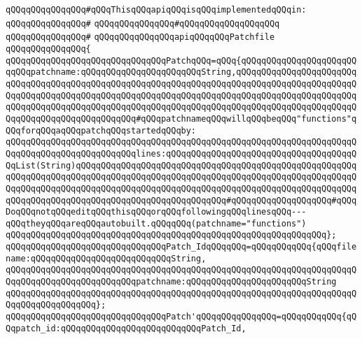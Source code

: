 \verb|qQQqqQQqqQQqqQQq#qQQqThisqQQqapiqQQqisqQQqimplementedqQQqin:|\newline
\verb|qQQqqQQqqQQqqQQq#|\newline
\verb|qQQqqQQqqQQqqQQq#qQQqqQQqqQQqqQQqqQQq|\newline
\verb|qQQqqQQqqQQqqQQq#|\newline
\verb|qQQqqQQqqQQqqQQqapiqQQqqQQqPatchfile|\newline
\verb|qQQqqQQqqQQqqQQq{|\newline
\verb|qQQqqQQqqQQqqQQqqQQqqQQqqQQqqQQqPatchqQQq=qQQq{qQQqqQQqqQQqqQQqqQQqqQQqqQQqpatchname:qQQqqQQqqQQqqQQqqQQqqQQqString,qQQqqQQqqQQqqQQqqQQqqQQqqQQqqQQqqQQqqQQqqQQqqQQqqQQqqQQqqQQqqQQqqQQqqQQqqQQqqQQqqQQqqQQqqQQqqQQqqQQqqQQqqQQqqQQqqQQqqQQqqQQqqQQqqQQqqQQqqQQqqQQqqQQqqQQqqQQqqQQqqQQqqQQqqQQqqQQqqQQqqQQqqQQqqQQqqQQqqQQqqQQqqQQqqQQqqQQqqQQqqQQqqQQqqQQqqQQqqQQqqQQqqQQqqQQqqQQqqQQq#qQQqpatchnameqQQqwillqQQqbeqQQq"functions"qQQqforqQQqaqQQqpatchqQQqstartedqQQqby:|\newline
\verb|qQQqqQQqqQQqqQQqqQQqqQQqqQQqqQQqqQQqqQQqqQQqqQQqqQQqqQQqqQQqqQQqqQQqqQQqqQQqqQQqqQQqqQQqqQQqqQQqlines:qQQqqQQqqQQqqQQqqQQqqQQqqQQqqQQqqQQqqQQqList(String)qQQqqQQqqQQqqQQqqQQqqQQqqQQqqQQqqQQqqQQqqQQqqQQqqQQqqQQqqQQqqQQqqQQqqQQqqQQqqQQqqQQqqQQqqQQqqQQqqQQqqQQqqQQqqQQqqQQqqQQqqQQqqQQqqQQqqQQqqQQqqQQqqQQqqQQqqQQqqQQqqQQqqQQqqQQqqQQqqQQqqQQqqQQqqQQqqQQqqQQqqQQqqQQqqQQqqQQqqQQqqQQqqQQqqQQqqQQqqQQq#qQQqqQQqqQQqqQQqqQQq#qQQqDoqQQqnotqQQqeditqQQqthisqQQqorqQQqfollowingqQQqlinesqQQq---qQQqtheyqQQqareqQQqautobuilt.qQQqqQQq(patchname="functions")|\newline
\verb|qQQqqQQqqQQqqQQqqQQqqQQqqQQqqQQqqQQqqQQqqQQqqQQqqQQqqQQqqQQqqQQq};|\newline
\newline
\verb|qQQqqQQqqQQqqQQqqQQqqQQqqQQqqQQqPatch_IdqQQqqQQq=qQQqqQQqqQQq{qQQqfilename:qQQqqQQqqQQqqQQqqQQqqQQqqQQqString,|\newline
\verb|qQQqqQQqqQQqqQQqqQQqqQQqqQQqqQQqqQQqqQQqqQQqqQQqqQQqqQQqqQQqqQQqqQQqqQQqqQQqqQQqqQQqqQQqqQQqqQQqpatchname:qQQqqQQqqQQqqQQqqQQqqQQqString|\newline
\verb|qQQqqQQqqQQqqQQqqQQqqQQqqQQqqQQqqQQqqQQqqQQqqQQqqQQqqQQqqQQqqQQqqQQqqQQqqQQqqQQqqQQqqQQq};|\newline
\newline
\verb|qQQqqQQqqQQqqQQqqQQqqQQqqQQqqQQqPatch'qQQqqQQqqQQqqQQq=qQQqqQQqqQQq{qQQqpatch_id:qQQqqQQqqQQqqQQqqQQqqQQqqQQqPatch_Id,|\newline
